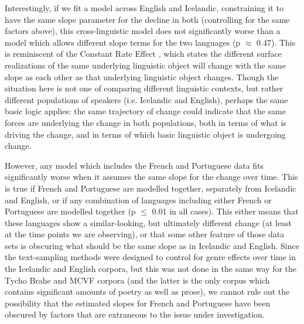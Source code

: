 
Interestingly, if we fit a model across English and Icelandic, constraining it to have the same slope parameter for the decline in both (controlling for the same factors above), this cross-linguistic model does not significantly worse than a model which allows different slope terms for the two languages (p $\approx$ 0.47). This is reminiscent of the Constant Rate Effect \citep[][among others]{kroch1989, pintzuk1991, santorini1993a}, which states the different surface realizations of the same underlying linguistic object will change with the same slope as each other as that underlying linguistic object changes. Though the situation here is not one of comparing different linguistic contexts, but rather different populations of speakers (i.e. Icelandic and English), perhaps the same basic logic applies: the same trajectory of change could indicate that the same forces are underlying the change in both populations, both in terms of what is driving the change, and in terms of which basic linguistic object is undergoing change. 

However, any model which includes the French and Portuguese data fits significantly worse when it assumes the same slope for the change over time. This is true if French and Portuguese are modelled together, separately from Icelandic and English, or if any combination of languages including either French or Portuguese are modelled together (p $\leq$ 0.01 in all cases). This either means that these languages show a similar-looking, but ultimately different change (at least at the time points we are observing), or that some other feature of those data sets is obscuring what should be the same slope as in Icelandic and English. Since the text-sampling methods were designed to control for genre effects over time in the Icelandic and English corpora, but this was not done in the same way for the Tycho Brahe and MCVF corpora (and the latter is the only corpus which contains significant amounts of poetry as well as prose), we cannot rule out the possibility that the estimated slopes for French and Portuguese have been obscured by factors that are extraneous to the issue under investigation.




